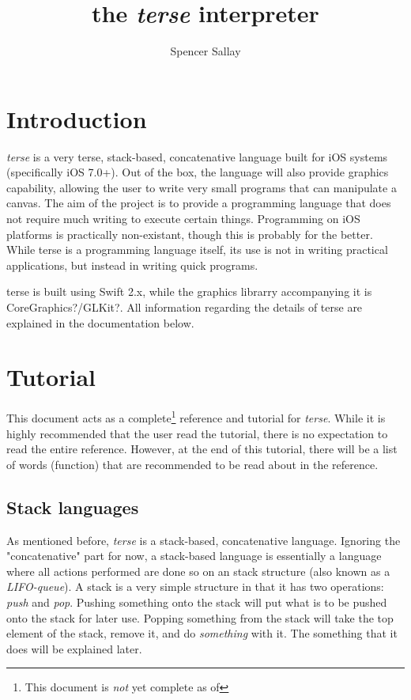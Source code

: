 \documentclass[12pt]{report}
\title{the \emph{terse} interpreter}
\author{Spencer Sallay}
\begin{document}
  \maketitle
  \tableofcontents
  \newpage
  \chapter{Introduction}
  \emph{terse} is a very terse, stack-based, concatenative language built for iOS systems
  (specifically iOS 7.0+).  Out of the box, the language will also provide graphics
  capability, allowing the user to write very small programs that can manipulate a 
  canvas.  The aim of the project is to provide a programming language that does not 
  require much writing to execute certain things.  Programming on iOS platforms is 
  practically non-existant, though this is probably for the better.  While terse is a 
  programming language itself, its use is not in writing practical applications, but 
  instead in writing quick programs.

  terse is built using Swift 2.x, while the graphics librarry accompanying it is 
  {CoreGraphics?/GLKit?}.  All information regarding the details of terse are explained
  in the documentation below.
  \chapter{Tutorial}
  This document acts as a complete\footnote{This document is \emph{not} yet complete as
  of \date{}} reference and tutorial for \emph{terse}.  While it is highly recommended
  that the user read the tutorial, there is no expectation to read the entire
  reference.  However, at the end of this tutorial, there will be a list of words 
  (function) that are recommended to be read about in the reference.
  \section{Stack languages}
  As mentioned before, \emph{terse} is a stack-based, concatenative language.  Ignoring
  the "concatenative" part for now, a stack-based language is essentially a language
  where all actions performed are done so on an stack structure (also known as a
  \emph{LIFO-queue}).  A stack is a very simple structure in that it has two
  operations: \emph{push} and \emph{pop}.  Pushing something onto the stack will put
  what is to be pushed onto the stack for later use.  Popping something from the
  stack will take the top element of the stack, remove it, and do \emph{something} with
  it.  The something that it does will be explained later.
\end{document}
